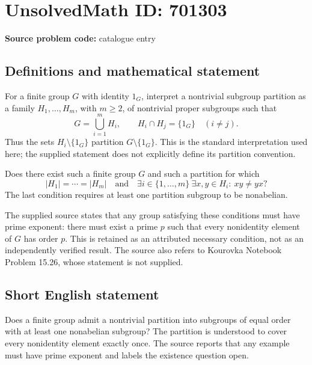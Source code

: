 \documentclass[11pt]{article}
\begin{document}
\section*{UnsolvedMath ID: 701303}
\textbf{Source problem code:} catalogue entry
\subsection{Definitions and mathematical statement}
For a finite group \(G\) with identity \(1_G\), interpret a nontrivial subgroup partition as a family \(H_1,\ldots,H_m\), with \(m\geq 2\), of nontrivial proper subgroups such that
\[
G=\bigcup_{i=1}^{m}H_i,
\qquad H_i\cap H_j=\{1_G\}\quad(i\ne j).
\]
Thus the sets \(H_i\setminus\{1_G\}\) partition \(G\setminus\{1_G\}\). This is the standard interpretation used here; the supplied statement does not explicitly define its partition convention.

Does there exist such a finite group \(G\) and such a partition for which
\[
|H_1|=\cdots=|H_m|
\quad\text{and}\quad
\exists i\in\{1,\ldots,m\}\ \exists x,y\in H_i:\ xy\ne yx?
\]
The last condition requires at least one partition subgroup to be nonabelian.

The supplied source states that any group satisfying these conditions must have prime exponent: there must exist a prime \(p\) such that every nonidentity element of \(G\) has order \(p\). This is retained as an attributed necessary condition, not as an independently verified result. The source also refers to Kourovka Notebook Problem 15.26, whose statement is not supplied.
\subsection{Short English statement}
Does a finite group admit a nontrivial partition into subgroups of equal order with at least one nonabelian subgroup? The partition is understood to cover every nonidentity element exactly once. The source reports that any example must have prime exponent and labels the existence question open.
\end{document}
